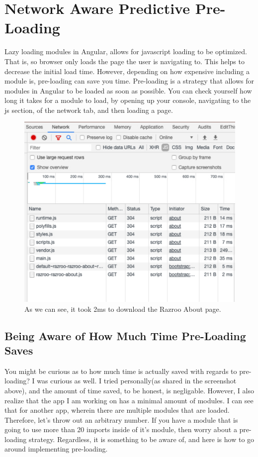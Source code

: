 \chapter{ Network Aware Predictive Pre-Loading }

Lazy loading modules in Angular, allows for javascript loading to be optimized. 
That is, so browser only loads the page the user is navigating to. This helps to
decrease the initial load time. However, depending on how expensive including a
module is, pre-loading can save you time. Pre-loading is a strategy that allows
for modules in Angular to be loaded as soon as possible. You can check yourself 
how long it takes for a module to load, by opening up your console, navigating 
to the js section, of the network tab, and then loading a page. 

\begin{figure}[h]
\includegraphics[width=414pt]{architecture/lazy-loading/network-aware-preloading/network-preloading-console-screenshot.pdf}
\caption{As we can see, it took 2ms to download the Razroo About page.}
\end{figure}

\section{ Being Aware of How Much Time Pre-Loading Saves }
You might be curious as to how much time is actually saved with regards to 
pre-loading? I was curious as well. I tried personally(as shared in the screenshot 
above), and the amount of time saved, to be honest, is negligable. However, I also
realize that the app I am working on has a minimal amount of modules. I can see that 
for another app, wherein there are multiple modules that are loaded. Therefore, 
let's throw out an arbitrary number. If you have a module that is going to 
use more than 20 imports inside of it's module, then worry about a pre-loading 
strategy. Regardless, it is something to be aware of, and here is how to go 
around implementing pre-loading. 


